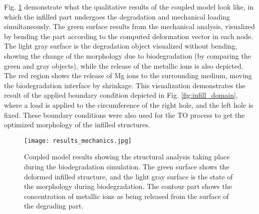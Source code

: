 Fig. \ref{fig:infill_results_mechanics} demonstrate what the qualitative results of the coupled model look like, in which the infilled part undergoes the degradation and mechanical loading simultaneously. The green surface results from the mechanical analysis, visualized by bending the part according to the computed deformation vector in each node. The light gray surface is the degradation object visualized without bending, showing the change of the morphology due to biodegradation (by comparing the green and gray objects), while the release of the metallic ions is also depicted. The red region shows the release of Mg ions to the surrounding medium, moving the biodegradation interface by shrinkage. This visualization demonstrates the result of the applied boundary condition depicted in Fig. \ref{fig:infill_domain}, where a load is applied to the circumference of the right hole, and the left hole is fixed. These boundary conditions were also used for the \gls{TO} process to get the optimized morphology of the infilled structures. 


\begin{figure}[h]
\centering
\medskip
\texttt{[image: results\_mechanics.jpg]}
\caption[Coupled model results showing the structural analysis taking place during biodegradation simulation]{Coupled model results showing the structural analysis taking place during the biodegradation simulation. The green surface shows the deformed infilled structure, and the light gray surface is the state of the morphology during biodegradation. The contour part shows the concentration of metallic ions as being released from the surface of the degrading part.} \label{fig:infill_results_mechanics}
\end{figure}

